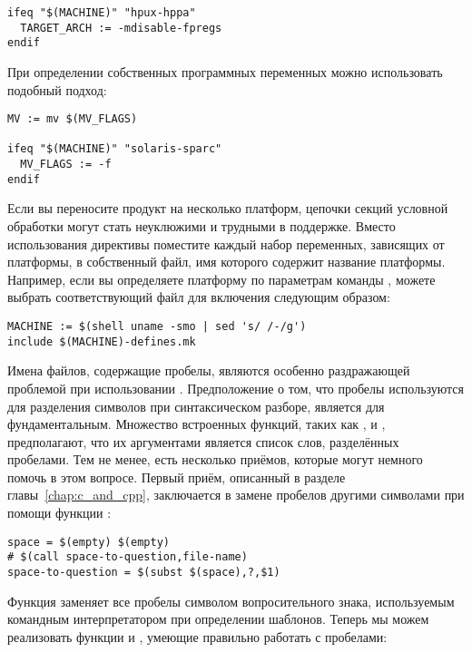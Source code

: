{\footnotesize
\begin{verbatim}
ifeq "$(MACHINE)" "hpux-hppa"
  TARGET_ARCH := -mdisable-fpregs
endif
\end{verbatim}
}

При определении собственных программных переменных можно использовать
подобный подход:

{\footnotesize
\begin{verbatim}
MV := mv $(MV_FLAGS)

ifeq "$(MACHINE)" "solaris-sparc"
  MV_FLAGS := -f
endif
\end{verbatim}
}

Если вы переносите продукт на несколько платформ, цепочки секций
условной обработки могут стать неуклюжими и трудными в поддержке.
Вместо использования директивы  поместите каждый
набор переменных, зависящих от платформы, в собственный файл, имя
которого содержит название платформы. Например, если вы определяете
платформу по параметрам команды , можете выбрать
соответствующий файл для включения следующим образом:

{\footnotesize
\begin{verbatim}
MACHINE := $(shell uname -smo | sed 's/ /-/g')
include $(MACHINE)-defines.mk
\end{verbatim}
}

Имена файлов, содержащие пробелы, являются особенно раздражающей
проблемой при использовании \GNUmake{}. Предположение о том, что
пробелы используются для разделения символов при синтаксическом
разборе, является для \GNUmake{} фундаментальным. Множество встроенных
функций, таких как ,  и
, предполагают, что их аргументами является список
слов, разделённых пробелами. Тем не менее, есть несколько приёмов,
которые могут немного помочь в этом вопросе.  Первый приём, описанный
в разделе~
главы~\ref{chap:c_and_cpp}, заключается в замене пробелов другими
символами при помощи функции :

{\footnotesize
\begin{verbatim}
space = $(empty) $(empty)
# $(call space-to-question,file-name)
space-to-question = $(subst $(space),?,$1)
\end{verbatim}
}

Функция  заменяет все пробелы символом
вопросительного знака, используемым командным интерпретатором при
определении шаблонов. Теперь мы можем реализовать функции
 и , умеющие правильно
работать с пробелами:

